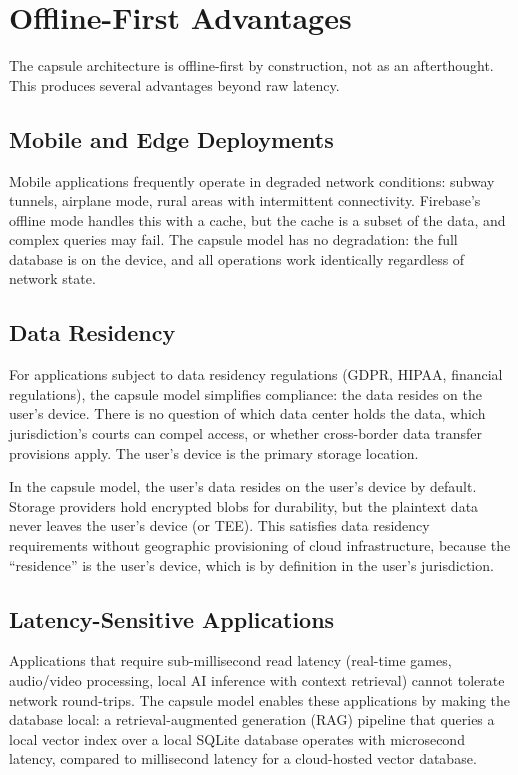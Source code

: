 \section{Offline-First Advantages}
\label{sec:offline}

The capsule architecture is offline-first by construction, not as an
afterthought. This produces several advantages beyond raw latency.

\subsection{Mobile and Edge Deployments}

Mobile applications frequently operate in degraded network conditions:
subway tunnels, airplane mode, rural areas with intermittent connectivity.
Firebase's offline mode handles this with a cache, but the cache is a
subset of the data, and complex queries may fail. The capsule model has
no degradation: the full database is on the device, and all operations
work identically regardless of network state.

\subsection{Data Residency}

For applications subject to data residency regulations (GDPR, HIPAA,
financial regulations), the capsule model simplifies compliance: the
data resides on the user's device. There is no question of which data
center holds the data, which jurisdiction's courts can compel access,
or whether cross-border data transfer provisions apply. The user's
device is the primary storage location.

\begin{proposition}
In the capsule model, the user's data resides on the user's device by
default. Storage providers hold encrypted blobs for durability, but
the plaintext data never leaves the user's device (or TEE). This
satisfies data residency requirements without geographic provisioning
of cloud infrastructure, because the ``residence'' is the user's
device, which is by definition in the user's jurisdiction.
\end{proposition}

\subsection{Latency-Sensitive Applications}

Applications that require sub-millisecond read latency (real-time games,
audio/video processing, local AI inference with context retrieval) cannot
tolerate network round-trips. The capsule model enables these applications
by making the database local: a retrieval-augmented generation (RAG)
pipeline that queries a local vector index over a local SQLite database
operates with microsecond latency, compared to millisecond latency for
a cloud-hosted vector database.

